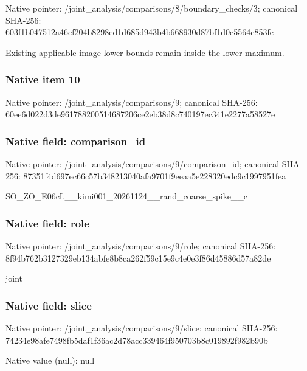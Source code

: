 \documentclass[10pt,a4paper]{article}
\begin{document}
Native pointer: /joint\_analysis/comparis\allowbreak{}ons/8/boundary\_checks/3; canonical SHA-256: 603f1b047512a46cf204b829\allowbreak{}8ed1d685d943b4b668930d87\allowbreak{}bf1d0c5564c853fe


Existing applicable image lower bounds remain inside the lower maximum.


\subsubsection{Native item 10}


Native pointer: /joint\_analysis/comparisons/9; canonical SHA-256: 60ee6d022d3de96178820051\allowbreak{}4687206ce2eb38d8c740197e\allowbreak{}c341e2277a58527e



\subsubsection{Native field: comparison\_id}


Native pointer: /joint\_analysis/comparis\allowbreak{}ons/9/comparison\_id; canonical SHA-256: 87351f4d697ec66c57b34821\allowbreak{}3040afa9701f9eeaa5e22832\allowbreak{}0edc9c1997951fea


SO\_ZO\_E06cL\_\_kimi001\_202\allowbreak{}61124\_\_rand\_coarse\_spike\allowbreak{}\_\_c


\subsubsection{Native field: role}


Native pointer: /joint\_analysis/comparisons/9/role; canonical SHA-256: 8f94b762b3127329eb134abf\allowbreak{}e8b8ca262f59c15e9c4e0e3f\allowbreak{}86d45886d57a82de


joint


\subsubsection{Native field: slice}


Native pointer: /joint\_analysis/comparisons/9/slice; canonical SHA-256: 74234e98afe7498fb5daf1f3\allowbreak{}6ac2d78acc339464f950703b\allowbreak{}8c019892f982b90b



Native value (null): null
\end{document}
